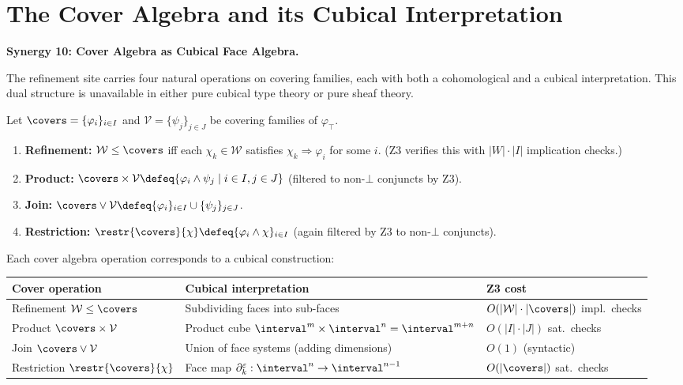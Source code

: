 \section{The Cover Algebra and its Cubical Interpretation}
\label{sec:cover-algebra}

\noindent\textbf{Synergy 10: Cover Algebra as Cubical Face Algebra.}

The refinement site carries four natural operations on covering families,
each with both a cohomological and a cubical interpretation.  This dual
structure is unavailable in either pure cubical type theory or pure sheaf
theory.

\begin{definition}
\label{def:cover-algebra}
Let $\covers = \{\varphi_i\}_{i \in I}$ and
$\mathcal{V} = \{\psi_j\}_{j \in J}$ be covering families of
$\varphi_\top$.
\begin{enumerate}
\item \textbf{Refinement:}
  $\mathcal{W} \leq \covers$ iff each $\chi_k \in \mathcal{W}$
  satisfies $\chi_k \Rightarrow \varphi_i$ for some $i$.
  (Z3 verifies this with $|W| \cdot |I|$ implication checks.)
\item \textbf{Product:}
  $\covers \times \mathcal{V} \defeq
  \{\varphi_i \wedge \psi_j \mid i \in I, j \in J\}$
  (filtered to non-$\bot$ conjuncts by Z3).
\item \textbf{Join:}
  $\covers \vee \mathcal{V} \defeq \{\varphi_i\}_{i \in I}
  \cup \{\psi_j\}_{j \in J}$.
\item \textbf{Restriction:}
  $\restr{\covers}{\chi} \defeq \{\varphi_i \wedge \chi\}_{i \in I}$
  (again filtered by Z3 to non-$\bot$ conjuncts).
\end{enumerate}
\end{definition}

\begin{proposition}
\label{prop:cover-cubical}
Each cover algebra operation corresponds to a cubical construction:
\begin{center}
\renewcommand{\arraystretch}{1.3}
\begin{tabular}{lll}
\toprule
\textbf{Cover operation} & \textbf{Cubical interpretation} &
  \textbf{Z3 cost} \\
\midrule
Refinement $\mathcal{W} \leq \covers$ &
  Subdividing faces into sub-faces &
  $O(|\mathcal{W}| \cdot |\covers|)$ impl.\ checks \\
Product $\covers \times \mathcal{V}$ &
  Product cube $\interval^m \times \interval^n = \interval^{m+n}$ &
  $O(|I| \cdot |J|)$ sat.\ checks \\
Join $\covers \vee \mathcal{V}$ &
  Union of face systems (adding dimensions) &
  $O(1)$ (syntactic) \\
Restriction $\restr{\covers}{\chi}$ &
  Face map $\partial^\varepsilon_k : \interval^n \to \interval^{n-1}$ &
  $O(|\covers|)$ sat.\ checks \\
\bottomrule
\end{tabular}
\end{center}
\end{proposition}


